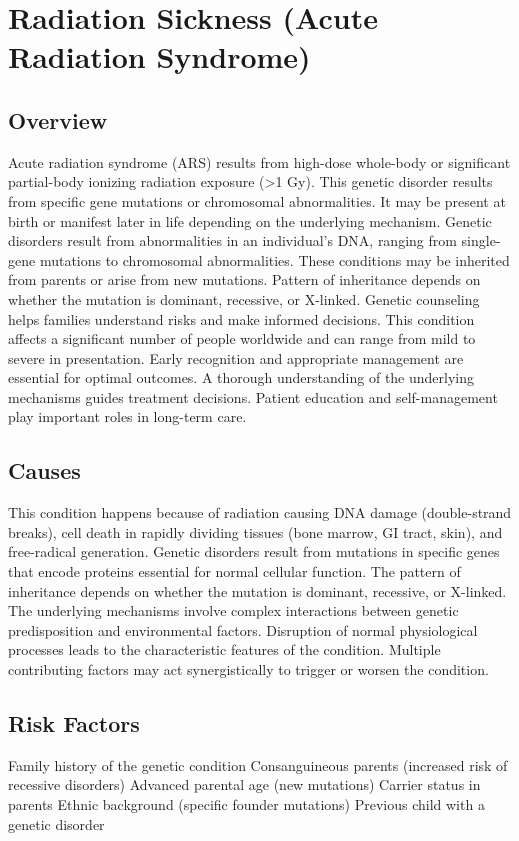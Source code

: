 \chapter{Radiation Sickness (Acute Radiation Syndrome)}
\label{sec:Radiation Sickness}

\section{Overview}
Acute radiation syndrome (ARS) results from high-dose whole-body or significant partial-body ionizing radiation exposure (>1 Gy). This genetic disorder results from specific gene mutations or chromosomal abnormalities. It may be present at birth or manifest later in life depending on the underlying mechanism. Genetic disorders result from abnormalities in an individual's DNA, ranging from single-gene mutations to chromosomal abnormalities. These conditions may be inherited from parents or arise from new mutations. Pattern of inheritance depends on whether the mutation is dominant, recessive, or X-linked. Genetic counseling helps families understand risks and make informed decisions. This condition affects a significant number of people worldwide and can range from mild to severe in presentation. Early recognition and appropriate management are essential for optimal outcomes. A thorough understanding of the underlying mechanisms guides treatment decisions. Patient education and self-management play important roles in long-term care.
\section{Causes}
This condition happens because of radiation causing DNA damage (double-strand breaks), cell death in rapidly dividing tissues (bone marrow, GI tract, skin), and free-radical generation. Genetic disorders result from mutations in specific genes that encode proteins essential for normal cellular function. The pattern of inheritance depends on whether the mutation is dominant, recessive, or X-linked. The underlying mechanisms involve complex interactions between genetic predisposition and environmental factors. Disruption of normal physiological processes leads to the characteristic features of the condition. Multiple contributing factors may act synergistically to trigger or worsen the condition.
\section{Risk Factors}
Family history of the genetic condition Consanguineous parents (increased risk of recessive disorders) Advanced parental age (new mutations) Carrier status in parents Ethnic background (specific founder mutations) Previous child with a genetic disorder

